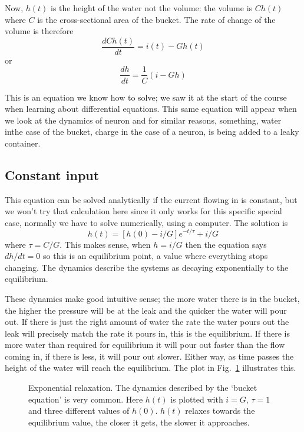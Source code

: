 \documentclass[12pt]{article}
\begin{document}
Now, $h(t)$ is the height of the water not the volume: the volume is
$Ch(t)$ where $C$ is the cross-sectional area of the bucket. The rate
of change of the volume is therefore
\begin{equation}
\frac{dCh(t)}{dt}=i(t)-Gh(t)
\end{equation}
or
\begin{equation}
\frac{dh}{dt}=\frac{1}{C}(i-Gh)
\end{equation}

This is an equation we know how to solve; we saw it at the start of
the course when learning about differential equations. This same
equation will appear when we look at the dynamics of neuron and for
similar reasons, something, water inthe case of the bucket, charge in
the case of a neuron, is being added to a leaky container.


\subsection*{Constant input}

This equation can be solved analytically if the current flowing in is
constant, but we won't try that calculation here since it only works
for this specific special case, normally we have to solve numerically,
using a computer. The solution is
\begin{equation}
h(t)=[h(0)-i/G]e^{-t/\tau}+i/G
\end{equation}
where $\tau=C/G$. This makes sense, when $h=i/G$ then the equation
says $dh/dt=0$ so this is an equilibrium point, a value where
everything stops changing. The dynamics describe the systems as
decaying exponentially to the equilibrium.

These dynamics make good intuitive sense; the more water there is in
the bucket, the higher the pressure will be at the leak and the
quicker the water will pour out. If there is just the right amount of
water the rate the water pours out the leak will precisely match the
rate it pours in, this is the equilibrium. If there is more water than
required for equilibrium it will pour out faster than the flow coming
in, if there is less, it will pour out slower. Either way, as time
passes the height of the water will reach the equilibrium. The plot in
Fig.~\ref{bucket_v} illustrates this.

\begin{figure}
\begin{center}

\end{center}
\caption{Exponential relaxation. The dynamics described by the
  \lq{}bucket equation\rq{} is very common. Here
  $h(t)$ is plotted with
  $i=G$, $\tau=1$ and three different values of
  $h(0)$. $h(t)$ relaxes towards the equilibrium value, the closer it gets, the slower it approaches.\label{bucket_v}}
\end{figure}
\end{document}
